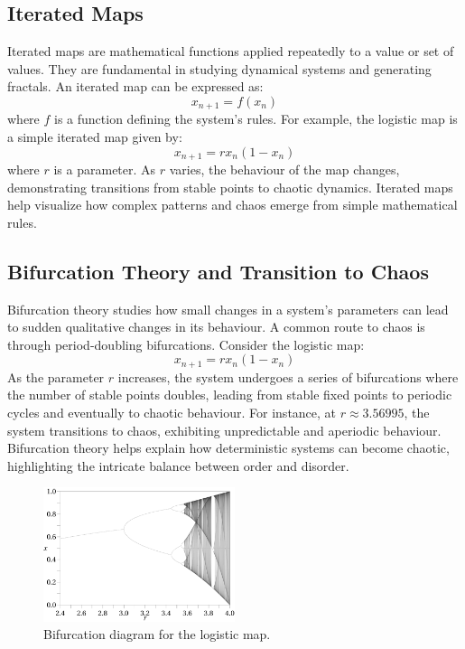 \documentclass[12pt]{article}
\begin{document}
\subsection{Iterated Maps}
Iterated maps are mathematical functions applied repeatedly to a value or set of values. They are fundamental in studying dynamical systems and generating fractals. An iterated map can be expressed as:
\[
x_{n+1} = f(x_n)
\]
where \( f \) is a function defining the system's rules. For example, the logistic map is a simple iterated map given by:
\[
x_{n+1} = r x_n (1 - x_n)
\]
where \( r \) is a parameter. As \( r \) varies, the behaviour of the map changes, demonstrating transitions from stable points to chaotic dynamics. Iterated maps help visualize how complex patterns and chaos emerge from simple mathematical rules.

\subsection{Bifurcation Theory and Transition to Chaos}
Bifurcation theory studies how small changes in a system's parameters can lead to sudden qualitative changes in its behaviour. A common route to chaos is through period-doubling bifurcations. Consider the logistic map:
\[
x_{n+1} = r x_n (1 - x_n)
\]
As the parameter \( r \) increases, the system undergoes a series of bifurcations where the number of stable points doubles, leading from stable fixed points to periodic cycles and eventually to chaotic behaviour. For instance, at \( r \approx 3.56995 \), the system transitions to chaos, exhibiting unpredictable and aperiodic behaviour. Bifurcation theory helps explain how deterministic systems can become chaotic, highlighting the intricate balance between order and disorder.

\begin{figure}[H]
\centering
\includegraphics[width=0.5\textwidth]{assets/bifurcation.png}
\caption{Bifurcation diagram for the logistic map.}
\label{fig:bifurcation}
\end{figure}
\end{document}
